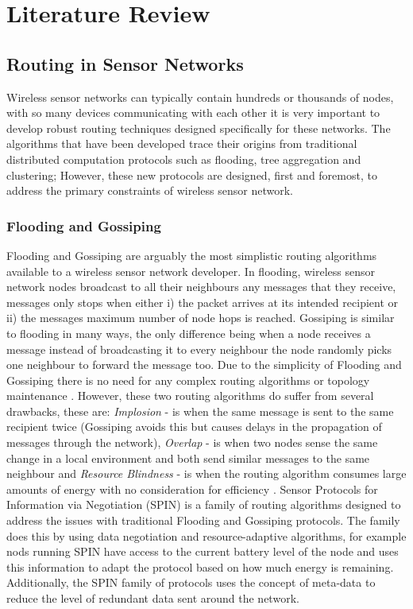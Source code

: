 \section{Literature Review}

\subsection{Routing in Sensor Networks}
Wireless sensor networks can typically contain hundreds or thousands of nodes, with so many devices communicating with each other it is very important to develop robust routing techniques designed specifically for these networks. The algorithms that have been developed trace their origins from traditional distributed computation protocols such as flooding, tree aggregation and clustering;  However, these new protocols are designed, first and foremost, to address the primary constraints of wireless sensor network.   

\subsubsection*{Flooding and Gossiping}
Flooding and Gossiping are arguably the most simplistic routing algorithms available to a wireless sensor network developer. In flooding, wireless sensor network nodes broadcast to all their neighbours any messages that they receive, messages only stops when either i) the packet arrives at its intended recipient or ii) the messages maximum number of node hops is reached. Gossiping is similar to flooding in many ways, the only difference being when a node receives a message instead of broadcasting it to every neighbour the node randomly picks one neighbour to forward the message too. Due to the simplicity of Flooding and Gossiping there is no need for any complex routing algorithms or topology maintenance \cite{Akkaya2005325}. However, these two routing algorithms do suffer from several drawbacks, these are: \emph{Implosion} - is when the same message is sent to the same recipient twice (Gossiping avoids this but causes delays in the propagation of messages through the network), \emph{Overlap} - is when two nodes sense the same change in a local environment and both send similar messages to the same neighbour and \emph{Resource Blindness} -  is when the routing algorithm consumes large amounts of energy with no consideration for efficiency \cite{Akkaya2005325}. Sensor Protocols for Information via Negotiation (SPIN) is a family of routing algorithms designed to address the issues with traditional Flooding and Gossiping protocols\cite{TankBible, Akkaya2005325}. The family does this by using data negotiation and resource-adaptive algorithms, for example nods running SPIN have access to the current battery level of the node and uses this information to adapt the protocol based on how much energy is remaining. Additionally, the SPIN family of protocols uses the concept of meta-data to reduce the level of redundant data sent around the network.

